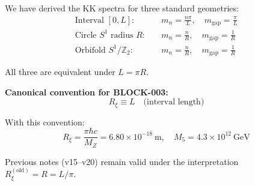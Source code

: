 \documentclass[11pt,a4paper]{article}
\newcommand{\Rxi}{R_\xi}
\newcommand{\Mfive}{M_5}
\newcommand{\MZ}{M_Z}
\newcommand{\mgap}{m_{\mathrm{gap}}}
\begin{document}
We have derived the KK spectra for three standard geometries:
\begin{align}
\text{Interval } [0, L]: \quad & m_n = \frac{n\pi}{L}, \quad \mgap = \frac{\pi}{L} \\
\text{Circle } S^1 \text{ radius } R: \quad & m_n = \frac{n}{R}, \quad \mgap = \frac{1}{R} \\
\text{Orbifold } S^1/\mathbb{Z}_2: \quad & m_n = \frac{n}{R}, \quad \mgap = \frac{1}{R}
\end{align}

All three are equivalent under $L = \pi R$.

\textbf{Canonical convention for BLOCK-003:}
\begin{equation}
\Rxi \equiv L \quad \text{(interval length)}
\end{equation}

With this convention:
\begin{equation}
\Rxi = \frac{\pi\hbar c}{\MZ} = 6.80 \times 10^{-18}~\mathrm{m}, \quad
\Mfive = 4.3 \times 10^{12}~\mathrm{GeV}
\end{equation}

Previous notes (v15--v20) remain valid under the interpretation $\Rxi^{(\mathrm{old})} = R = L/\pi$.
\end{document}
